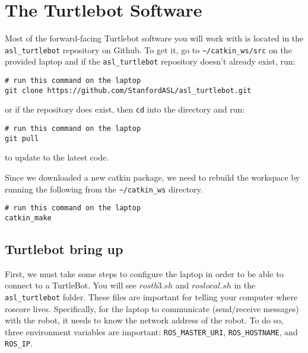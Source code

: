 \section{The Turtlebot Software}
Most of the forward-facing Turtlebot software you will work with is located in the \texttt{asl\_turtlebot} repository on Github. To get it, go to \texttt{\textasciitilde/catkin\_ws/src} on the provided laptop and if the \texttt{asl\_turtlebot} repository doesn't already exist, run:

\begin{lstlisting}
# run this command on the laptop
git clone https://github.com/StanfordASL/asl_turtlebot.git
\end{lstlisting}

or if the repository does exist, then \texttt{cd} into the directory and run:

\begin{lstlisting}
# run this command on the laptop
git pull
\end{lstlisting}

to update to the latest code.

Since we downloaded a new catkin package, we need to rebuild the workspace by running the following from the \texttt{\textasciitilde/catkin\_ws} directory.

\begin{lstlisting}
# run this command on the laptop
catkin_make
\end{lstlisting}

\subsection{Turtlebot bring up}
First, we must take some steps to configure the laptop in order to be able to connect to a TurtleBot. You will see $rostb3.sh$ and $roslocal.sh$ in the \texttt{asl\_turtlebot} folder. These files are important for telling your computer where roscore lives. %
Specifically, for the laptop to communicate (send/receive messages) with the robot, it needs to know the network address of the robot. To do so, three environment variables are important: \texttt{ROS\_MASTER\_URI}, \texttt{ROS\_HOSTNAME}, and \texttt{ROS\_IP}.


